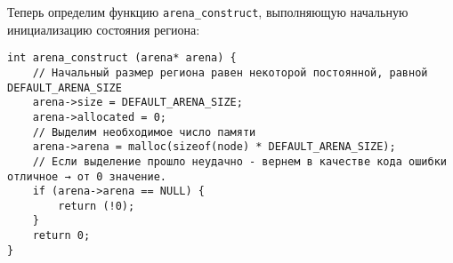 Теперь определим функцию \verb|arena_construct|, выполняющую начальную
инициализацию состояния региона:

\begin{verbatim}
int arena_construct (arena* arena) { 
    // Начальный размер региона равен некоторой постоянной, равной DEFAULT_ARENA_SIZE 
    arena->size = DEFAULT_ARENA_SIZE;
    arena->allocated = 0; 
    // Выделим необходимое число памяти 
    arena->arena = malloc(sizeof(node) * DEFAULT_ARENA_SIZE); 
    // Если выделение прошло неудачно - вернем в качестве кода ошибки отличное → от 0 значение. 
    if (arena->arena == NULL) { 
        return (!0); 
    } 
    return 0; 
}
\end{verbatim}
